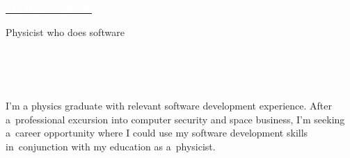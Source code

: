 \documentclass[10pt]{developercv} %
\begin{document}

\begin{minipage}[t]{0.7\textwidth} %
	\vspace{-\baselineskip} %
	
	\colorbox{COLOR_1}{\href{https://www.linkedin.com/in/marcin-kruk-a5486111a/}{{\HUGE\textcolor{white}{\textbf{\MakeUppercase{Marcin Kruk}}}}}} %
	
	
	\vspace{10pt}
	
	{\huge Physicist who does software} %
\end{minipage}
\begin{minipage}[t]{0.3\textwidth}
	\vspace{-\baselineskip} %
	
	\\
	\\
	\\
\end{minipage}

\vspace{0.5cm}


    I'm a physics graduate with relevant software development experience. After a~professional excursion into computer security and space business, I'm seeking a~career opportunity where I could use my software development skills in~conjunction with my education as a~physicist.
\end{document}
